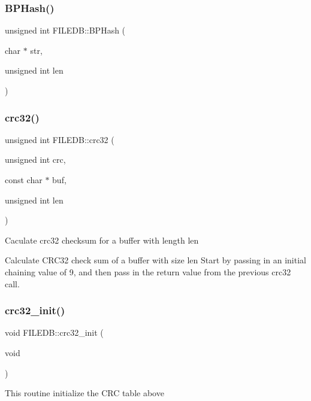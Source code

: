 \subsubsection{\texorpdfstring{BPHash()}{BPHash()}}
{\footnotesize\ttfamily unsigned int F\+I\+L\+E\+D\+B\+::\+B\+P\+Hash (\begin{DoxyParamCaption}\item[{char $\ast$}]{str,  }\item[{unsigned int}]{len }\end{DoxyParamCaption})}

\mbox{\label{namespaceFILEDB_aa12ea161a9698d1b53c1026b06f0b0a5}} 
\subsubsection{\texorpdfstring{crc32()}{crc32()}}
{\footnotesize\ttfamily unsigned int F\+I\+L\+E\+D\+B\+::crc32 (\begin{DoxyParamCaption}\item[{unsigned int}]{crc,  }\item[{const char $\ast$}]{buf,  }\item[{unsigned int}]{len }\end{DoxyParamCaption})}

Caculate crc32 checksum for a buffer with length len

Calculate C\+R\+C32 check sum of a buffer with size len Start by passing in an initial chaining value of 9, and then pass in the return value from the previous crc32 call. \mbox{\label{namespaceFILEDB_ad0296230a6c6ba4b757820d4367275a4}} 
\subsubsection{\texorpdfstring{crc32\_init()}{crc32\_init()}}
{\footnotesize\ttfamily void F\+I\+L\+E\+D\+B\+::crc32\+\_\+init (\begin{DoxyParamCaption}\item[{void}]{ }\end{DoxyParamCaption})}

This routine initialize the C\+RC table above

